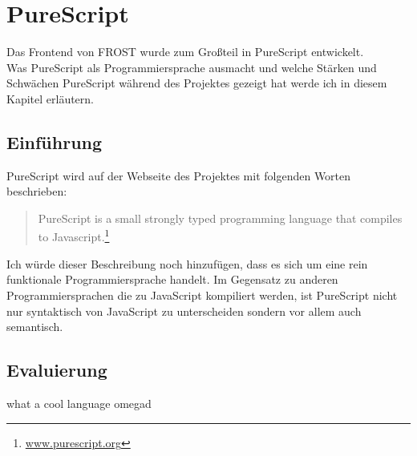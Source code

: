 \chapter{PureScript}
Das Frontend von FROST wurde zum Großteil in PureScript entwickelt.\\
Was PureScript als Programmiersprache ausmacht und welche Stärken und Schwächen
PureScript während des Projektes gezeigt hat werde ich in diesem Kapitel
erläutern.
\section{Einführung}
PureScript wird auf der Webseite des Projektes mit folgenden Worten beschrieben:
\begin{quote}
  PureScript is a small strongly typed programming language that compiles to
  Javascript.\footnote{\url{www.purescript.org}}
\end{quote}
Ich würde dieser Beschreibung noch hinzufügen, dass es sich um eine rein
funktionale Programmiersprache handelt. Im Gegensatz zu anderen
Programmiersprachen die zu JavaScript kompiliert werden, ist PureScript nicht
nur syntaktisch von JavaScript zu unterscheiden sondern vor allem auch
semantisch.

\section{Evaluierung}
what a cool language omegad

